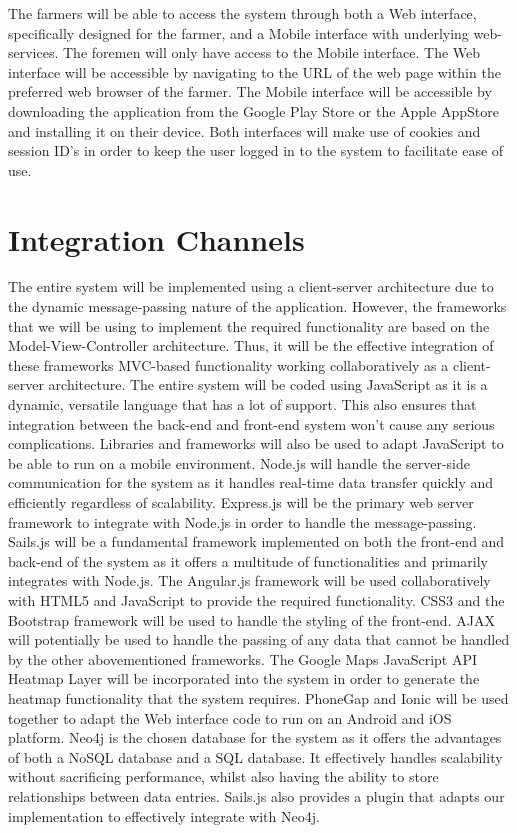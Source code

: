 \documentclass[11pt,fleqn]{book} %
\begin{document}
	The farmers will be able to access the system through both a Web interface, specifically designed for the farmer, and a Mobile interface with underlying web-services. The foremen will only have access to the Mobile interface. The Web interface will be accessible by navigating to the URL of the web page within the preferred web browser of the farmer. The Mobile interface will be accessible by downloading the application from the Google Play Store or the Apple AppStore and installing it on their device. Both interfaces will make use of cookies and session ID’s in order to keep the user logged in to the system to facilitate ease of use.
	
	\section{Integration Channels}
	The entire system will be implemented using a client-server architecture due to the dynamic message-passing nature of the application. However, the frameworks that we will be using to implement the required functionality are based on the Model-View-Controller architecture. Thus, it will be the effective integration of these frameworks MVC-based functionality working collaboratively as a client-server architecture. The entire system will be coded using JavaScript as it is a dynamic, versatile language that has a lot of support. This also ensures that integration between the back-end and front-end system won’t cause any serious complications. Libraries and frameworks will also be used to adapt JavaScript to be able to run on a mobile environment.\newline\newline
	Node.js will handle the server-side communication for the system as it handles real-time data transfer quickly and efficiently regardless of scalability. Express.js will be the primary web server framework to integrate with Node.js in order to handle the message-passing. Sails.js will be a fundamental framework implemented on both the front-end and back-end of the system as it offers a multitude of functionalities and primarily integrates with Node.js. The Angular.js framework will be used collaboratively with HTML5 and JavaScript to provide the required functionality. CSS3 and the Bootstrap framework will be used to handle the styling of the front-end. AJAX will potentially be used to handle the passing of any data that cannot be handled by the other abovementioned frameworks. The Google Maps JavaScript API Heatmap Layer will be incorporated into the system in order to generate the heatmap functionality that the system requires. PhoneGap and Ionic will be used together to adapt the Web interface code to run on an Android  and iOS platform.\newline\newline
	Neo4j is the chosen database for the system as it offers the advantages of both a NoSQL database and a SQL database. It effectively handles scalability without sacrificing performance, whilst also having the ability to store relationships between data entries. Sails.js also provides a plugin that adapts our implementation to effectively integrate with Neo4j.
	
\end{document}
